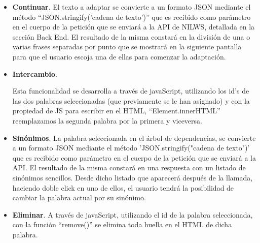 	\begin{itemize}
		 \item  \textbf{Continuar}.
		El texto a adaptar se convierte a un formato JSON mediante el método ``JSON.stringify('cadena de texto')'' que es recibido como parámetro en el cuerpo de la petición que se enviará a la API de NILWS, detallada en la sección Back End. El resultado de la misma constará en la división de una o varias frases separadas por punto que se mostrará en la siguiente pantalla para que el usuario escoja una de ellas para comenzar la adaptación.  
		
		
		\item \textbf{Intercambio}.
		
		Esta funcionalidad se desarrolla a través de javaScript, utilizando los id's de las dos palabras seleccionadas (que previamente se le han asignado) y con la propiedad de JS para escribir en el HTML, ``Element.innerHTML'' reemplazamos la segunda palabra por la primera y viceversa.
		  
			\item  \textbf{Sinónimos}.
			La palabra seleccionada en el árbol de dependencias, se convierte a un formato JSON mediante el método 'JSON.stringify("cadena de texto")' que es recibido como parámetro en el cuerpo de la petición que se enviará a la API. El resultado de la misma constará en una respuesta con un listado de sinónimos sencillos. Desde dicho listado que aparecerá después de la llamada, haciendo doble click en uno de ellos, el usuario tendrá la posibilidad de cambiar la palabra actual por su sinónimo.  
			\item  \textbf{Eliminar}.
			A través de javaScript, utilizando el id de la palabra seleccionada, con la función ``remove()'' se elimina toda huella en el HTML de dicha palabra.
\end{itemize}
				
